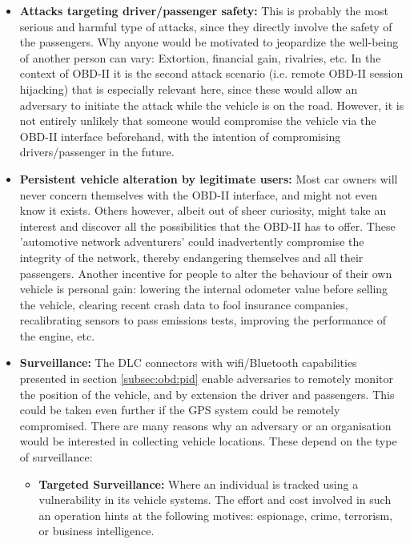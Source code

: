 \begin{itemize}
	\item \textbf{Attacks targeting driver/passenger safety:} This is probably the most serious and harmful type of attacks, since they directly involve the safety of the passengers. Why anyone would be motivated to jeopardize the well-being of another person can vary: Extortion, financial gain, rivalries, etc. In the context of OBD-II it is the second attack scenario (i.e. remote OBD-II session hijacking) that is especially relevant here, since these would allow an adversary to initiate the attack while the vehicle is on the road. However, it is not entirely unlikely that someone would compromise the vehicle via the OBD-II interface beforehand, with the intention of compromising drivers/passenger in the future.
	
	
	\item \textbf{Persistent vehicle alteration by legitimate users:} Most car owners will never concern themselves with the OBD-II interface, and might not even know it exists. Others however, albeit out of sheer curiosity, might take an interest and discover all the possibilities that the OBD-II has to offer. These 'automotive network adventurers' could inadvertently compromise the integrity of the network, thereby endangering themselves and all their passengers. Another incentive for people to alter the behaviour of their own vehicle is personal gain: lowering the internal odometer value before selling the vehicle, clearing recent crash data to fool insurance companies, recalibrating sensors to pass emissions tests, improving the performance of the engine, etc.  
	
	\item \textbf{Surveillance:} The DLC connectors with wifi/Bluetooth capabilities presented in section \ref{subsec:obd:pid} enable adversaries to remotely monitor the position of the vehicle, and by extension the driver and passengers. This could be taken even further if the GPS system could be remotely compromised. There are many reasons why an adversary or an organisation would be interested in collecting vehicle locations. These depend on the type of surveillance: 
	\begin{itemize}
		\item \textbf{Targeted Surveillance:} Where an individual is tracked using a vulnerability in its vehicle systems. The effort and cost involved in such an operation hints at the following motives: espionage, crime, terrorism, or business intelligence.
		

\end{itemize}
\end{itemize}
